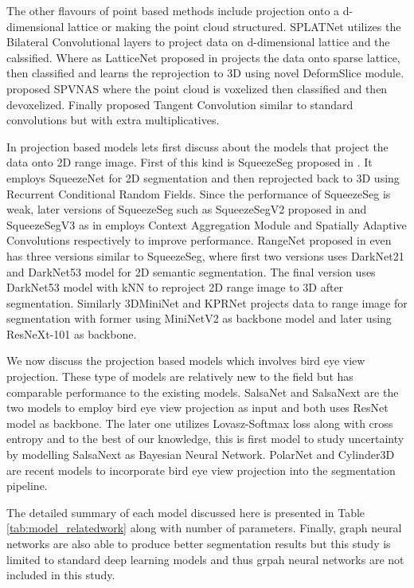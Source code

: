 The other flavours of point based methods include projection onto a d-dimensional lattice or making the point cloud structured.
SPLATNet \cite{Su_2018_CVPR_splatnet} utilizes the Bilateral Convolutional layers to project data on d-dimensional lattice and the calssified.
Where as LatticeNet proposed in \cite{rosu2019latticenet} projects the data onto sparse lattice, then classified and learns the reprojection to 3D using novel DeformSlice module.
\cite{spvnas} proposed SPVNAS where the point cloud is voxelized then classified and then devoxelized.
Finally \cite{Tatarchenko_2018_CVPR_tangconv} proposed Tangent Convolution similar to standard convolutions but with extra multiplicatives.

In projection based models lets first discuss about the models that project the data onto 2D range image.
First of this kind is SqueezeSeg proposed in \cite{Sequeseseg_2018}. It employs SqueezeNet for 2D segmentation and then reprojected back to 3D using Recurrent Conditional Random Fields.
Since the performance of SqueezeSeg is weak, later versions of SqueezeSeg such as SqueezeSegV2 proposed in \cite{SqueezeSegv2} and SqueezeSegV3 as in \cite{xu2020squeezesegv3} employs Context Aggregation Module and Spatially Adaptive Convolutions respectively to improve performance.
RangeNet proposed in \cite{Milioto2019} even has three versions similar to SqueezeSeg, where first two versions uses DarkNet21 and DarkNet53 model for 2D semantic segmentation.
The final version uses DarkNet53 model with kNN to reproject 2D range image to 3D after segmentation.
Similarly 3DMiniNet \cite{3Dmininet} and KPRNet \cite{kochanov2020kprnet} projects data to range image for segmentation with former using MiniNetV2 as backbone model and later using ResNeXt-101 as backbone.

We now discuss the projection based models which involves bird eye view projection.
These type of models are relatively new to the field but has comparable performance to the existing models.
SalsaNet \cite{salsanet2020} and SalsaNext \cite{SalsaNext_2020} are the two models to employ bird eye view projection as input and both uses ResNet model as backbone.
The later one utilizes Lovasz-Softmax loss along with cross entropy and to the best of our knowledge, this is first model to study uncertainty by modelling SalsaNext as Bayesian Neural Network.
PolarNet \cite{polarnet} and Cylinder3D \cite{zhu2020cylindrical} are recent models to incorporate bird eye view projection into the segmentation pipeline.

The detailed summary of each model discussed here is presented in Table \ref{tab:model_relatedwork} along with number of parameters.
Finally, graph neural networks \cite{dyn_graph_cnn} are also able to produce better segmentation results but this study is limited to standard deep learning models and thus grpah neural networks are not included in this study.



